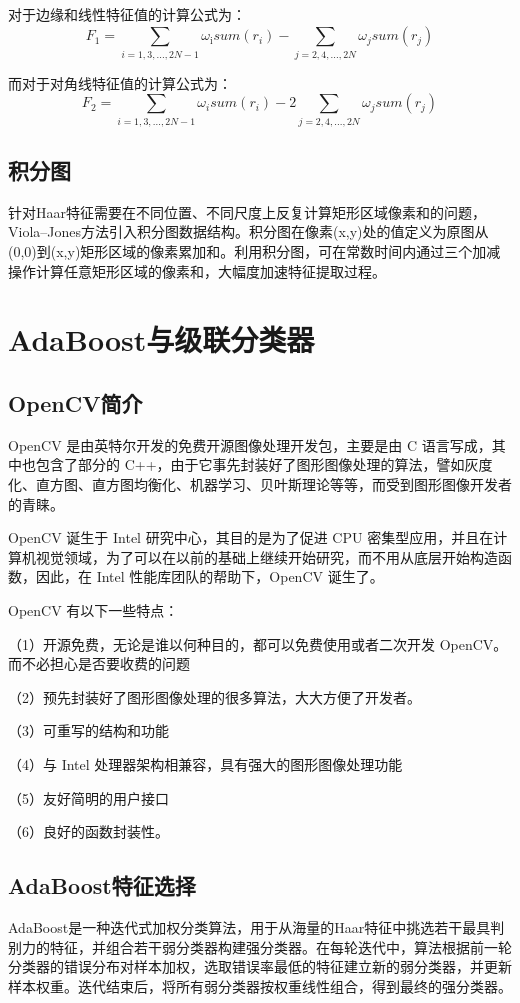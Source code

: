 \documentclass[UTF8]{ctexart}
\begin{document}
对于边缘和线性特征值的计算公式为\cite{wang2014}：\[{{F}_{1}}=\sum\limits_{i=1,3,...,2N-1}^{{}}{{{\omega }_{\text{i}}}sum({{r}_{i}})}-\sum\limits_{j=2,4,...,2N}{{{\omega }_{j}}sum({{r}_{j}})}\]

而对于对角线特征值的计算公式为\cite{wang2014}：\[{{F}_{2}}=\sum\limits_{i=1,3,...,2N-1}{{{\omega }_{i}}sum({{r}_{i}})}-2\sum\limits_{j=2,4,...,2N}{{{\omega }_{j}}sum({{r}_{j}})}\]

\subsection{积分图}
针对Haar特征需要在不同位置、不同尺度上反复计算矩形区域像素和的问题，Viola–Jones方法引入积分图数据结构。积分图在像素(x,y)处的值定义为原图从(0,0)到(x,y)矩形区域的像素累加和。利用积分图，可在常数时间内通过三个加减操作计算任意矩形区域的像素和，大幅度加速特征提取过程。

\section{AdaBoost与级联分类器}
\subsection{OpenCV简介}
OpenCV 是由英特尔开发的免费开源图像处理开发包，主要是由 C 语言写成，其中也包含了部分的 C++，由于它事先封装好了图形图像处理的算法，譬如灰度化、直方图、直方图均衡化、机器学习、贝叶斯理论等等，而受到图形图像开发者的青睐。

OpenCV 诞生于 Intel 研究中心，其目的是为了促进 CPU 密集型应用，并且在计算机视觉领域，为了可以在以前的基础上继续开始研究，而不用从底层开始构造函数，因此，在 Intel 性能库团队的帮助下，OpenCV 诞生了。

OpenCV 有以下一些特点\cite{hou2012}：

（1）开源免费，无论是谁以何种目的，都可以免费使用或者二次开发 OpenCV。而不必担心是否要收费的问题

（2）预先封装好了图形图像处理的很多算法，大大方便了开发者。

（3）可重写的结构和功能

（4）与 Intel 处理器架构相兼容，具有强大的图形图像处理功能

（5）友好简明的用户接口

（6）良好的函数封装性。

\subsection{AdaBoost特征选择}
AdaBoost是一种迭代式加权分类算法，用于从海量的Haar特征中挑选若干最具判别力的特征，并组合若干弱分类器构建强分类器。在每轮迭代中，算法根据前一轮分类器的错误分布对样本加权，选取错误率最低的特征建立新的弱分类器，并更新样本权重。迭代结束后，将所有弱分类器按权重线性组合，得到最终的强分类器。
\end{document}
